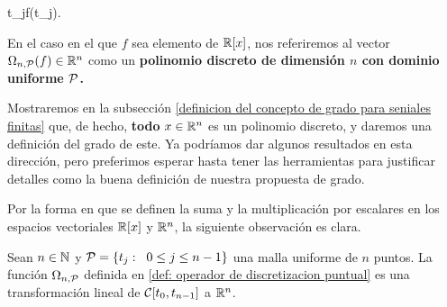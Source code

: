 \begin{center}
{}
{\IR }
{t_{j}}{f(t_{j}).}
\end{center}



\begin{defi} \label{def: polinomio discreto}
En el caso en el que $f$ sea elemento de $\mathbb{R}[x]$, 
nos referiremos
al vector $\Omega_{n,\mathcal{P}}(f) \in \mathbb{R}^{n}$
como un \textbf{polinomio discreto
de dimensión $n$ con dominio uniforme $\mathcal{P}$.} 
\end{defi} 



Mostraremos en la subsección
\ref{definicion del concepto de grado para seniales finitas}
que, de hecho, \textbf{todo}
$x \in \mathbb{R}^{n}$ es un polinomio discreto,
y daremos una definición del grado de este.
Ya podríamos dar algunos resultados en esta dirección,
pero preferimos esperar hasta tener las herramientas
para justificar detalles como la buena definición
de nuestra propuesta de grado.


Por la forma en que se definen la suma y la multiplicación
por escalares en los espacios vectoriales $\mathbb{R}[x]$
y $\mathbb{R}^{n}$, la siguiente observación es clara.

\begin{obs} \label{obs:linealidad de omega restringida a R[x]}
Sean $n \in \mathbb{N}$ y $\mathcal{P}=\{t_{j}:
\hspace{0.2cm}0 \leq j \leq n-1 \}$ una malla uniforme
de $n$ puntos.
La función $\Omega_{n , \mathcal{P}}$ 
definida en 
\ref{def: operador de discretizacion puntual}
es una transformación lineal de 
$\mathcal{C}[t_{0}, t_{n-1}]$ a $\mathbb{R}^{n}$.
\end{obs}
 


